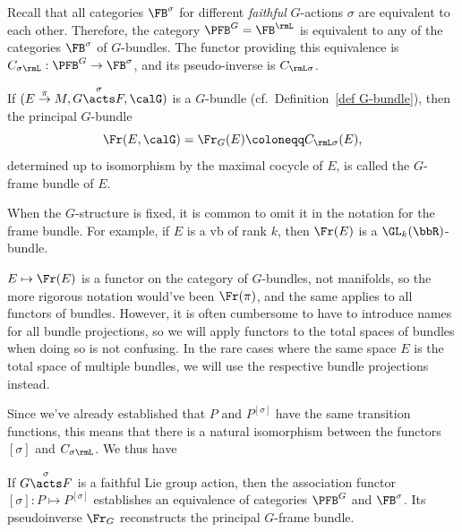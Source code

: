 Recall that all categories $\FB^\sigma$ for different \emph{faithful} $G$-actions $\sigma$ are equivalent to each other. Therefore, the category $\PFB^G=\FB^\rmL$ is equivalent to any of the categories $\FB^\sigma$ of $G$-bundles. The functor providing this equivalence is $C_{\sigma \rmL}:\PFB^G\to \FB^\sigma$, and its pseudo-inverse is $C_{\rmL\sigma}$. 

\begin{defn}
    If $(E\overset{\pi}{\to}M,G\overset{\sigma}{\acts}F,\calG)$ is a $G$-bundle (cf.\ Definition~\ref{def G-bundle}), then the principal $G$-bundle 
    \[\Fr(E,\calG)=\Fr_G(E)\coloneqq C_{\rmL \sigma}(E),\] 
    determined up to isomorphism by the maximal cocycle of $E$, is called the $G$-frame bundle of $E$.
\end{defn}

\begin{rem}
    When the $G$-structure is fixed, it is common to omit it in the notation for the frame bundle. For example, if $E$ is a \gls{vb} of rank $k$, then $\Fr(E)$ is a $\GL_k(\bbR)$-bundle.

    $E\mapsto \Fr(E)$ is a functor on the category of $G$-bundles, not manifolds, so the more rigorous notation would've been $\Fr(\pi)$, and the same applies to all functors of bundles. However, it is often cumbersome to have to introduce names for all bundle projections, so we will apply functors to the total spaces of bundles when doing so is not confusing. In the rare cases where the same space $E$ is the total space of multiple bundles, we will use the respective bundle projections instead.
\end{rem}

Since we've already established that $P$ and $P^{[\sigma]}$ have the same transition functions, this means that there is a natural isomorphism between the functors $[\sigma]$ and $C_{\sigma \rmL}$. We thus have
\begin{prop}
    If $G\overset{\sigma}{\acts}F$ is a faithful Lie group action, then the association functor $[\sigma]:P\mapsto P^{[\sigma]}$ establishes an equivalence of categories $\PFB^G$ and $\FB^\sigma$. Its pseudoinverse $\Fr_G$ reconstructs the principal $G$-frame bundle.
\end{prop}

